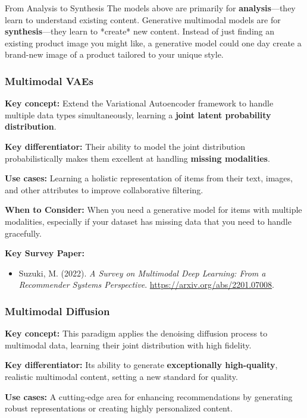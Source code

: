 \documentclass{article}
\begin{document}
    \begin{asidebox}{From Analysis to Synthesis}
    The models above are primarily for \textbf{analysis}—they learn to understand existing content. Generative multimodal models are for \textbf{synthesis}—they learn to *create* new content. Instead of just finding an existing product image you might like, a generative model could one day create a brand-new image of a product tailored to your unique style.
    \end{asidebox}

    \subsubsection{Multimodal VAEs}
\noindent\textbf{Key concept:} Extend the Variational Autoencoder framework to handle multiple data types simultaneously, learning a \textbf{joint latent probability distribution}.

\noindent\textbf{Key differentiator:} Their ability to model the joint distribution probabilistically makes them excellent at handling \textbf{missing modalities}.

\noindent\textbf{Use cases:} Learning a holistic representation of items from their text, images, and other attributes to improve collaborative filtering.

\noindent\textbf{When to Consider:} When you need a generative model for items with multiple modalities, especially if your dataset has missing data that you need to handle gracefully.

\noindent\textbf{Key Survey Paper:}
    \begin{itemize}
        \item Suzuki, M. (2022). \textit{A Survey on Multimodal Deep Learning: From a Recommender Systems Perspective}. \url{https://arxiv.org/abs/2201.07008}.
    \end{itemize}

    \subsubsection{Multimodal Diffusion}
\noindent\textbf{Key concept:} This paradigm applies the denoising diffusion process to multimodal data, learning their joint distribution with high fidelity.

\noindent\textbf{Key differentiator:} Its ability to generate \textbf{exceptionally high-quality}, realistic multimodal content, setting a new standard for quality.

\noindent\textbf{Use cases:} A cutting-edge area for enhancing recommendations by generating robust representations or creating highly personalized content.
\end{document}
